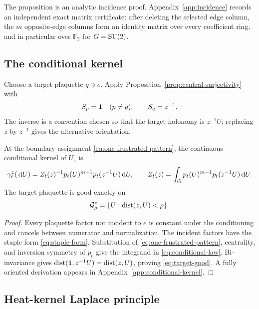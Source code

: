 The proposition is an analytic incidence proof.  Appendix~\ref{app:incidence}
records an independent exact matrix certificate: after deleting the selected
edge column, the $m$ opposite-edge columns form an identity matrix over every
coefficient ring, and in particular over $\mathbb F_2$ for $G=\mathrm{SU}(2)$.

\subsection{The conditional kernel}

Choose a target plaquette $q\ni e$.  Apply
Proposition~\ref{prop:central-surjectivity} with
\begin{equation}\label{eq:one-frustrated-pattern}
 S_p=\mathbf 1\quad(p\neq q),\qquad S_q=z^{-1}.
\end{equation}
The inverse is a convention chosen so that the target holonomy is
$z^{-1}U$; replacing $z$ by $z^{-1}$ gives the alternative orientation.

\begin{proposition}\label{prop:conditional-law}
At the boundary assignment \eqref{eq:one-frustrated-pattern}, the continuous
conditional kernel of $U_e$ is
\begin{equation}\label{eq:conditional-law}
 \gamma_t^z(\,\mathrm d U)=Z_t(z)^{-1}
 p_t(U)^{m-1}p_t(z^{-1}U)\,\mathrm dU,
\qquad
 Z_t(z)=\int_Gp_t(U)^{m-1}p_t(z^{-1}U)\,\mathrm dU.
\end{equation}
The target plaquette is good exactly on
\begin{equation}\label{eq:target-good}
  \mathcal G_\rho^z=\{U:\operatorname{dist}(z,U)<\rho\}.
\end{equation}
\end{proposition}

\begin{proof}
Every plaquette factor not incident to $e$ is constant under the
conditioning and cancels between numerator and normalization.  The incident
factors have the staple form \eqref{eq:staple-form}.  Substitution of
\eqref{eq:one-frustrated-pattern}, centrality, and inversion symmetry of
$p_t$ give the integrand in \eqref{eq:conditional-law}.  Bi-invariance gives
$\operatorname{dist}(\mathbf 1,z^{-1}U)=\operatorname{dist}(z,U)$, proving \eqref{eq:target-good}.  A fully
oriented derivation appears in Appendix~\ref{app:conditional-kernel}.
\end{proof}

\subsection{Heat-kernel Laplace principle}

